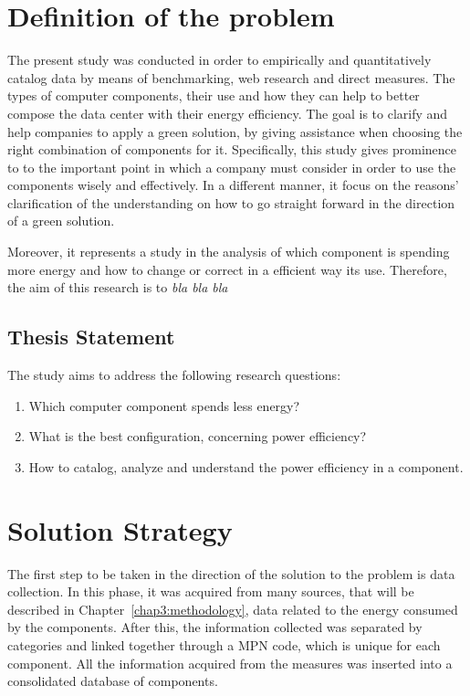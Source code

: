 \section{Definition of the problem} \label{sec1:problem}
    
    The present study was conducted in order to empirically and quantitatively catalog data by means of benchmarking, web research and direct measures. The types of computer components, their use and how they can help to better compose the data center with their energy efficiency. The goal is to clarify and help companies to apply a green solution, by giving assistance when choosing the right combination of components for it. Specifically, this study gives prominence to to the important point in which a company must consider in order to use the components wisely and effectively. In a different manner, it focus on the reasons' clarification of the understanding on how to go straight forward in the direction of a green solution.
    
    Moreover, it represents a study in the analysis of which component is spending more energy and how to change or correct in a efficient way its use. Therefore, the aim of this research is to \emph{bla bla bla}%
    
    \subsection{Thesis Statement}\label{sec1:thesis_statement}
        The study aims to address the following research questions:
        \begin{enumerate}
	        \item Which computer component spends less energy?
	        \item What is the best configuration, concerning power efficiency?
	        \item How to catalog, analyze and understand the power efficiency in a component.
        \end{enumerate}

\section{Solution Strategy} \label{sec1:solution_strategy}
    The first step to be taken in the direction of the solution to the problem is data collection. In this phase, it was acquired from many sources, that will be described in Chapter~\ref{chap3:methodology}, data related to the energy consumed by the components. After this, the information collected was separated by categories and linked together through a MPN code, which is unique for each component. All the information acquired from the measures was inserted into a consolidated database of components.
    
